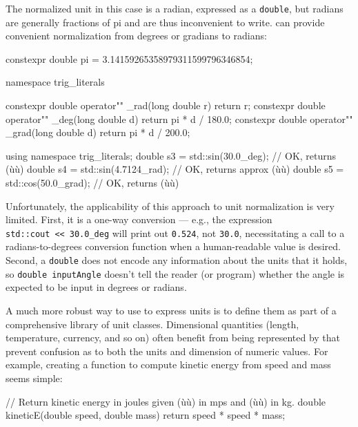 \noindent The normalized unit in this case is a radian, expressed as a
\lstinline!double!, but radians are generally fractions of pi and are thus
inconvenient to write.  can provide convenient
normalization from degrees or gradians to radians:

\begin{emcppslisting}
constexpr double pi = 3.14159265358979311599796346854;

namespace trig_literals {

constexpr double operator"" _rad(long double r)  { return r; }
constexpr double operator"" _deg(long double d)  { return pi * d / 180.0; }
constexpr double operator"" _grad(long double d) { return pi * d / 200.0; }

}

using namespace trig_literals;
double s3 = std::sin(30.0_deg);     // OK, returns (ù{}ù)
double s4 = std::sin(4.7124_rad);   // OK, returns approx (ù{}ù)
double s5 = std::cos(50.0_grad);    // OK, returns (ù{}ù)
\end{emcppslisting}
    
\noindent Unfortunately, the applicability of this approach to unit normalization
is very limited. First, it is a one-way conversion --- e.g., the
expression \lstinline!std::cout!~\lstinline!<<!~\lstinline!30.0_deg! will print
out \lstinline!0.524!, not \lstinline!30.0!, necessitating a call to a
radians-to-degrees conversion function when a human-readable value is
desired. Second, a \lstinline!double! does not encode any information about
the units that it holds, so \lstinline!double!~\lstinline!inputAngle! doesn't
tell the reader (or program) whether the angle is expected to be input
in degrees or radians.

A much more robust way to use  to express units is to
define them as part of a comprehensive library of unit classes.
Dimensional quantities (length, temperature, currency, and so on) often
benefit from being represented by  that
prevent confusion as to both the units and dimension of numeric values.
For example, creating a function to compute kinetic energy from speed
and mass seems simple:

\begin{emcppslisting}
// Return kinetic energy in joules given (ù{}ù) in mps and (ù{}ù) in kg.
double kineticE(double speed, double mass)
{
    return speed * speed * mass;
}
\end{emcppslisting}
    
